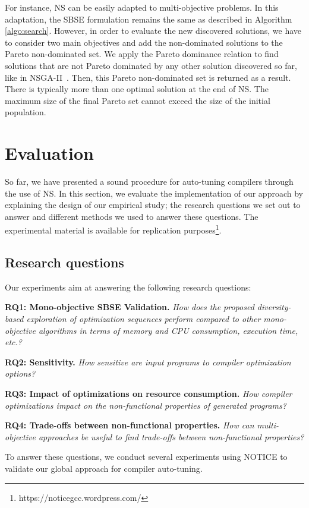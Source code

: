 For instance, NS can be easily adapted to multi-objective problems. In this adaptation, the SBSE formulation remains the same as described in Algorithm \ref{algo:search}. However, in order to evaluate the new discovered solutions, we have to consider two main objectives and add the non-dominated solutions to the Pareto non-dominated set. We apply the Pareto dominance relation to find solutions that are not Pareto dominated by any other solution discovered so far, like in NSGA-II~\cite{lokuciejewski2010multi, deb2002fast}. Then, this Pareto non-dominated set is returned as a result.
There is typically more than one optimal solution at the end of NS. The maximum size of the final Pareto set cannot exceed the size of the initial population.


\section{Evaluation}
\label{sec:comp-eval}
So far, we have presented a sound procedure for auto-tuning compilers through the use of NS. In this section, we evaluate the implementation of our approach by explaining the design of our empirical study; the research questions we set out to answer and different methods we used to answer these questions. The experimental material is available for replication purposes\footnote{https://noticegcc.wordpress.com/}.

\subsection{Research questions}
Our experiments aim at answering the following research questions:

\textbf{RQ1: Mono-objective SBSE Validation.} 
\textit{How does the proposed diversity-based exploration of optimization sequences perform compared to other mono-objective algorithms in terms of memory and CPU consumption, execution time, etc.?} 


\textbf{RQ2: Sensitivity.} 
\textit{How sensitive are input programs to compiler optimization options?}


\textbf{RQ3: Impact of optimizations on resource consumption.} 
\textit{How compiler optimizations impact on the non-functional properties of generated programs?}


\textbf{RQ4: Trade-offs between non-functional properties.} 
\textit{How can multi-objective approaches be useful to find trade-offs between non-functional properties?}

To answer these questions, we conduct several experiments using NOTICE to validate our global approach for compiler auto-tuning.


